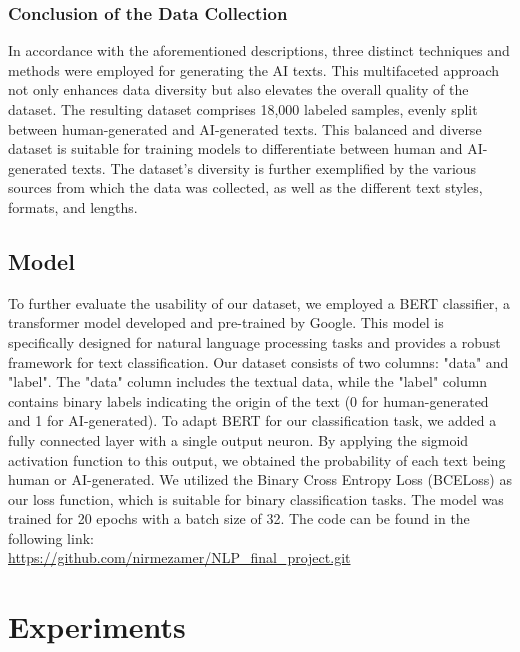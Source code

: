 \documentclass[11pt]{article}
\begin{document}
\subsubsection{Conclusion of the Data Collection}
In accordance with the aforementioned descriptions, three distinct techniques and methods were employed for generating the AI texts. This multifaceted approach not only enhances data diversity but also elevates the overall quality of the dataset. The resulting dataset comprises 18,000 labeled samples, evenly split between human-generated and AI-generated texts. This balanced and diverse dataset is suitable for training models to differentiate between human and AI-generated texts. The dataset's diversity is further exemplified by the various sources from which the data was collected, as well as the different text styles, formats, and lengths.
\subsection{Model}
To further evaluate the usability of our dataset, we employed a BERT classifier, a transformer model developed and pre-trained by Google. This model is specifically designed for natural language processing tasks and provides a robust framework for text classification.
Our dataset consists of two columns: "data" and "label". The "data" column includes the textual data, while the "label" column contains binary labels indicating the origin of the text (0 for human-generated and 1 for AI-generated). To adapt BERT for our classification task, we added a fully connected layer with a single output neuron. By applying the sigmoid activation function to this output, we obtained the probability of each text being human or AI-generated.
We utilized the Binary Cross Entropy Loss (BCELoss) as our loss function, which is suitable for binary classification tasks. The model was trained for 20 epochs with a batch size of 32.
The code can be found in the following link:\\\url{https://github.com/nirmezamer/NLP_final_project.git}

\section{Experiments}
\end{document}
